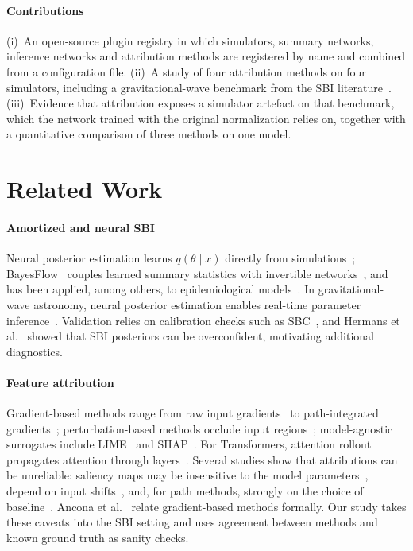 \documentclass[conference]{IEEEtran}
\begin{document}
\paragraph{Contributions}
(i)~An open-source plugin registry in which simulators, summary networks, inference networks and attribution
methods are registered by name and combined from a configuration file.
(ii)~A study of four attribution methods on four simulators, including a gravitational-wave benchmark from the
SBI literature~\cite{deistler2025practical}.
(iii)~Evidence that attribution exposes a simulator artefact on that benchmark, which the network trained with
the original normalization relies on, together with a quantitative comparison of three methods on one model.

\section{Related Work}

\paragraph{Amortized and neural SBI}
Neural posterior estimation learns $q(\theta\mid x)$ directly from simulations~\cite{papamakarios2016fast,greenberg2019automatic};
BayesFlow~\cite{radev2020bayesflow,radev2023bayesflow} couples learned summary statistics with invertible
networks~\cite{dinh2017realnvp,durkan2019neural}, and has been applied, among others, to epidemiological
models~\cite{radev2021outbreakflow}. In gravitational-wave astronomy, neural posterior estimation enables
real-time parameter inference~\cite{dax2021realtime}. Validation relies on calibration checks such as
SBC~\cite{talts2018sbc}, and Hermans et al.~\cite{hermans2022trust} showed that SBI posteriors can be
overconfident, motivating additional diagnostics.

\paragraph{Feature attribution}
Gradient-based methods range from raw input gradients~\cite{simonyan2014deep} to path-integrated
gradients~\cite{sundararajan2017axiomatic}; perturbation-based methods occlude input regions~\cite{zeiler2014visualizing};
model-agnostic surrogates include LIME~\cite{ribeiro2016lime} and SHAP~\cite{lundberg2017shap}. For
Transformers, attention rollout propagates attention through layers~\cite{abnar2020quantifying}. Several
studies show that attributions can be unreliable: saliency maps may be insensitive to the model
parameters~\cite{adebayo2018sanity}, depend on input shifts~\cite{kindermans2019unreliability}, and, for
path methods, strongly on the choice of baseline~\cite{sturmfels2020baselines}. Ancona et al.~\cite{ancona2018towards}
relate gradient-based methods formally. Our study takes these caveats into the SBI setting and uses agreement
between methods and known ground truth as sanity checks.
\end{document}
